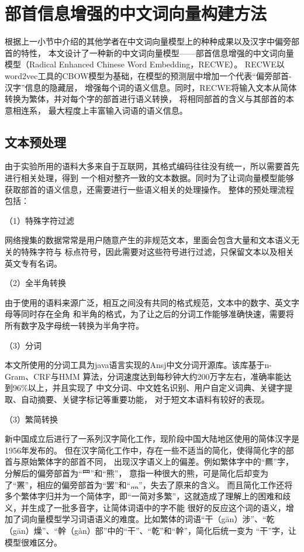 \section{部首信息增强的中文词向量构建方法}
根据上一小节中介绍的其他学者在中文词向量模型上的种种成果以及汉字中偏旁部首的特性，
本文设计了一种新的中文词向量模型——部首信息增强的中文词向量模型（Radical Enhanced Chinese Word Embedding，RECWE）。
RECWE以word2vec工具的CBOW模型为基础，在模型的预测层中增加一个代表“偏旁部首-汉字”信息的隐藏层，
增强每个词的语义信息。同时，RECWE将输入文本从简体转换为繁体，并对每个字的部首进行语义转换，
将相同部首的含义与其部首的本意相连系，
最大程度上丰富输入词语的语义信息。
\subsection{文本预处理}
由于实验所用的语料大多来自于互联网，其格式编码往往没有统一，所以需要首先进行相关处理，得到
一个相对整齐一致的文本数据。同时为了让词向量模型能够获取部首的语义信息，还需要进行一些语义相关的处理操作。
整体的预处理流程包括：

（1）特殊字符过滤

网络搜集的数据常常是用户随意产生的非规范文本，里面会包含大量和文本语义无关的特殊字符与
标点符号，因此需要对这些符号进行过滤，只保留文本以及相关英文专有名词。

（2）全半角转换

由于使用的语料来源广泛，相互之间没有共同的格式规范，文本中的数字、英文字母等同时存在全角
和半角的格式，为了让之后的分词工作能够准确快速，需要将所有数字及字母统一转换为半角字符。

（3）分词

本文所使用的分词工具为java语言实现的Ansj中文分词开源库。该库基于n-Gram、CRF与HMM
算法，分词速度达到每秒钟大约200万字左右，准确率能达到96\%以上，并且实现了
中文分词、中文姓名识别、用户自定义词典、关键字提取、自动摘要、关键字标记等重要功能，
对于短文本语料有较好的表现。

（3）繁简转换

新中国成立后进行了一系列汉字简化工作，现阶段中国大陆地区使用的简体汉字是1956年发布的。
但在汉字简化工作中，存在一些不适当的简化，使得简化字的部首与原始繁体字的部首不同，
出现汉字语义上的偏差。例如繁体字中的“羆”字，分解后的偏旁部首为“罒”和“熊”，
意指一种很大的熊，可是简化后却变为了“罴”，相应的偏旁部首为“罢”和“灬”，失去了原来的含义。
而且简化工作还将多个繁体字归并为一个简体字，即“一简对多繁”，这就造成了理解上的困难和歧义，并生成了一批多音字，让简体词语中的字不能
很好的反应这个词的语义，增加了词向量模型学习词语语义的难度。比如繁体的词语“干（gān）涉”、“乾（gān）燥”、“幹（gàn）部”中的“干”、“乾”和“幹”，简化后统一变为
“干”字，让模型很难区分。

